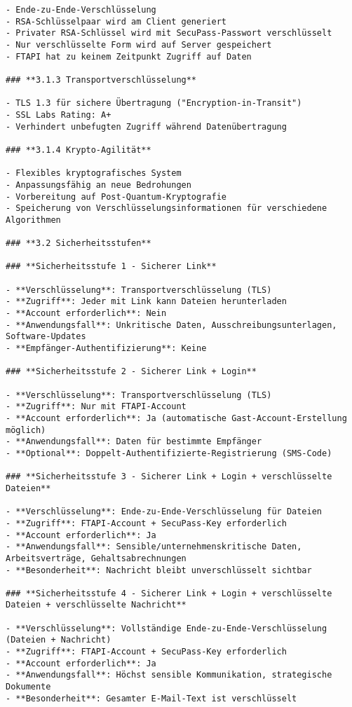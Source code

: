 \begin{verbatim}
- Ende-zu-Ende-Verschlüsselung
- RSA-Schlüsselpaar wird am Client generiert
- Privater RSA-Schlüssel wird mit SecuPass-Passwort verschlüsselt
- Nur verschlüsselte Form wird auf Server gespeichert
- FTAPI hat zu keinem Zeitpunkt Zugriff auf Daten

### **3.1.3 Transportverschlüsselung**

- TLS 1.3 für sichere Übertragung ("Encryption-in-Transit")
- SSL Labs Rating: A+
- Verhindert unbefugten Zugriff während Datenübertragung

### **3.1.4 Krypto-Agilität**

- Flexibles kryptografisches System
- Anpassungsfähig an neue Bedrohungen
- Vorbereitung auf Post-Quantum-Kryptografie
- Speicherung von Verschlüsselungsinformationen für verschiedene Algorithmen

### **3.2 Sicherheitsstufen**

### **Sicherheitsstufe 1 - Sicherer Link**

- **Verschlüsselung**: Transportverschlüsselung (TLS)
- **Zugriff**: Jeder mit Link kann Dateien herunterladen
- **Account erforderlich**: Nein
- **Anwendungsfall**: Unkritische Daten, Ausschreibungsunterlagen, Software-Updates
- **Empfänger-Authentifizierung**: Keine

### **Sicherheitsstufe 2 - Sicherer Link + Login**

- **Verschlüsselung**: Transportverschlüsselung (TLS)
- **Zugriff**: Nur mit FTAPI-Account
- **Account erforderlich**: Ja (automatische Gast-Account-Erstellung möglich)
- **Anwendungsfall**: Daten für bestimmte Empfänger
- **Optional**: Doppelt-Authentifizierte-Registrierung (SMS-Code)

### **Sicherheitsstufe 3 - Sicherer Link + Login + verschlüsselte Dateien**

- **Verschlüsselung**: Ende-zu-Ende-Verschlüsselung für Dateien
- **Zugriff**: FTAPI-Account + SecuPass-Key erforderlich
- **Account erforderlich**: Ja
- **Anwendungsfall**: Sensible/unternehmenskritische Daten, Arbeitsverträge, Gehaltsabrechnungen
- **Besonderheit**: Nachricht bleibt unverschlüsselt sichtbar

### **Sicherheitsstufe 4 - Sicherer Link + Login + verschlüsselte Dateien + verschlüsselte Nachricht**

- **Verschlüsselung**: Vollständige Ende-zu-Ende-Verschlüsselung (Dateien + Nachricht)
- **Zugriff**: FTAPI-Account + SecuPass-Key erforderlich
- **Account erforderlich**: Ja
- **Anwendungsfall**: Höchst sensible Kommunikation, strategische Dokumente
- **Besonderheit**: Gesamter E-Mail-Text ist verschlüsselt


\end{verbatim}

